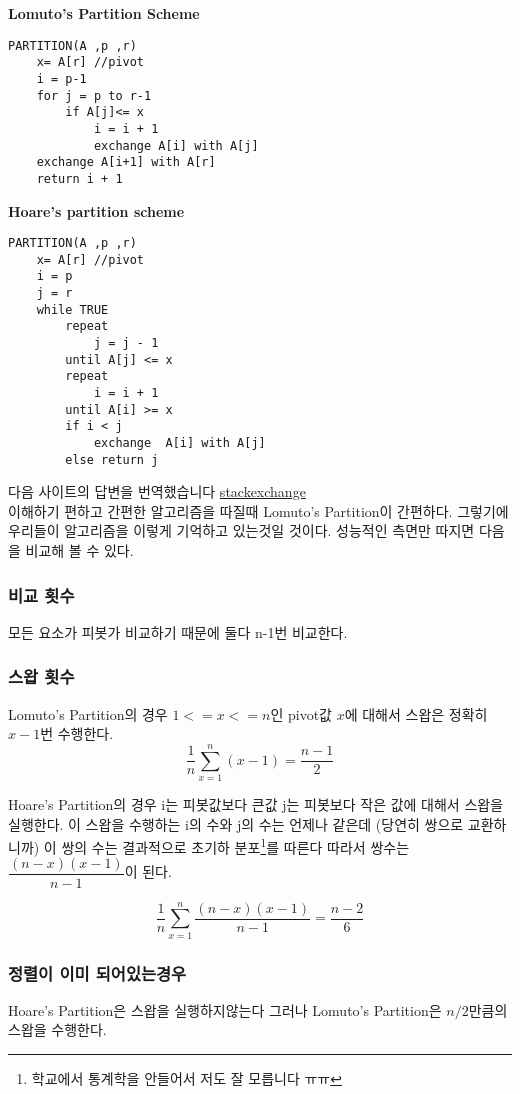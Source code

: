 \textbf{Lomuto’s Partition Scheme}
\begin{lstlisting}[style = CStyle]
PARTITION(A ,p ,r)
    x= A[r] //pivot
    i = p-1
    for j = p to r-1
        if A[j]<= x
            i = i + 1
            exchange A[i] with A[j]
    exchange A[i+1] with A[r]
    return i + 1
\end{lstlisting}


\textbf{Hoare's partition scheme}

\begin{lstlisting}[style = CStyle]
PARTITION(A ,p ,r)
    x= A[r] //pivot
    i = p
    j = r
    while TRUE
        repeat
            j = j - 1
        until A[j] <= x
        repeat
            i = i + 1
        until A[i] >= x
        if i < j
            exchange  A[i] with A[j]
        else return j
\end{lstlisting}


다음 사이트의 답변을 번역했습니다 \href{https://cs.stackexchange.com/questions/11458/quicksort-partitioning-hoare-vs-lomuto}{stackexchange}\\

이해하기 편하고 간편한 알고리즘을 따질때 Lomuto’s Partition이 간편하다. 그렇기에 우리들이 알고리즘을 이렇게 기억하고 있는것일 것이다. 성능적인 측면만 따지면 다음을 비교해 볼 수 있다.

\subsubsection{비교 횟수}
모든 요소가 피봇가 비교하기 때문에 둘다 n-1번 비교한다.

\subsubsection{스왑 횟수}
Lomuto's Partition의 경우 $1 <= x <= n$인 pivot값 $x$에 대해서 스왑은 정확히 $x-1$번 수행한다.
$$\dfrac{1}{n} \sum_{x=1}^{n}(x-1) = \dfrac{n-1}{2}$$

Hoare's Partition의 경우 i는 피봇값보다 큰값 j는 피봇보다 작은 값에 대해서 스왑을 실행한다. 이 스왑을 수행하는 i의 수와 j의 수는 언제나 같은데 (당연히 쌍으로 교환하니까) 이 쌍의 수는 결과적으로  초기하 분포\footnote{학교에서 통계학을 안들어서 저도 잘 모릅니다 ㅠㅠ}를 따른다 따라서 
쌍수는 $\dfrac{(n-x)(x-1)}{n-1}$이 된다.

$$\dfrac{1}{n} \sum_{x=1}^{n} \dfrac{(n-x)(x-1)}{n-1} = \dfrac{n-2}{6}$$



\subsubsection{정렬이 이미 되어있는경우}
Hoare's Partition은 스왑을 실행하지않는다 그러나 Lomuto’s Partition은 $n/2$만큼의 스왑을 수행한다.


